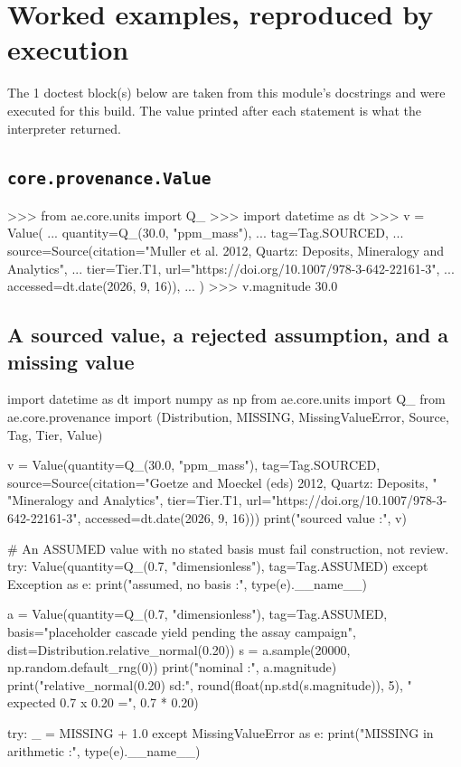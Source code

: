 \documentclass[10pt,a4paper,twoside]{report}
\begin{document}
\section{Worked examples, reproduced by execution}

The 1 doctest block(s) below are taken from this module's docstrings and were executed for this build. The value printed after each statement is what the interpreter returned.

\subsection*{\texttt{core.provenance.Value}}

\begin{doctestblock}
>>> from ae.core.units import Q_
>>> import datetime as dt
>>> v = Value(
...     quantity=Q_(30.0, "ppm_mass"),
...     tag=Tag.SOURCED,
...     source=Source(citation="Muller et al. 2012, Quartz: Deposits, Mineralogy and Analytics",
...                   tier=Tier.T1, url="https://doi.org/10.1007/978-3-642-22161-3",
...                   accessed=dt.date(2026, 9, 16)),
... )
>>> v.magnitude
30.0
\end{doctestblock}

\subsection*{A sourced value, a rejected assumption, and a missing value}

\begin{doctestblock}
import datetime as dt
import numpy as np
from ae.core.units import Q_
from ae.core.provenance import (Distribution, MISSING, MissingValueError, Source,
                                Tag, Tier, Value)

v = Value(quantity=Q_(30.0, "ppm_mass"), tag=Tag.SOURCED,
          source=Source(citation="Goetze and Moeckel (eds) 2012, Quartz: Deposits, "
                                 "Mineralogy and Analytics",
                        tier=Tier.T1, url="https://doi.org/10.1007/978-3-642-22161-3",
                        accessed=dt.date(2026, 9, 16)))
print("sourced value           :", v)

# An ASSUMED value with no stated basis must fail construction, not review.
try:
    Value(quantity=Q_(0.7, "dimensionless"), tag=Tag.ASSUMED)
except Exception as e:
    print("assumed, no basis       :", type(e).__name__)

a = Value(quantity=Q_(0.7, "dimensionless"), tag=Tag.ASSUMED,
          basis="placeholder cascade yield pending the assay campaign",
          dist=Distribution.relative_normal(0.20))
s = a.sample(20000, np.random.default_rng(0))
print("nominal                 :", a.magnitude)
print("relative_normal(0.20) sd:", round(float(np.std(s.magnitude)), 5),
      " expected 0.7 x 0.20 =", 0.7 * 0.20)

try:
    _ = MISSING + 1.0
except MissingValueError as e:
    print("MISSING in arithmetic   :", type(e).__name__)
\end{doctestblock}
\end{document}
